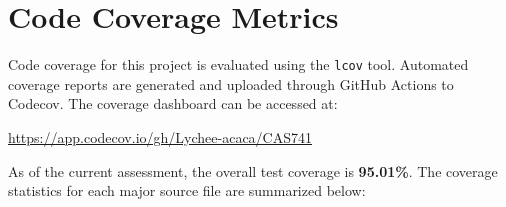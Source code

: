 \documentclass[12pt, titlepage]{article}
\begin{document}
\begin{table}[htbp!]
  \centering
  \caption{Traceability Matrix Showing the Connections Between Unit Tests and Modules}
  \label{Table:tc_trace}
\end{table}

\clearpage

\section{Code Coverage Metrics}

Code coverage for this project is evaluated using the \texttt{lcov} tool.
Automated coverage reports are generated and uploaded through GitHub Actions to
Codecov. The coverage dashboard can be accessed at:

\begin{center}
\url{https://app.codecov.io/gh/Lychee-acaca/CAS741}
\end{center}

As of the current assessment, the overall test coverage is \textbf{95.01\%}. The
coverage statistics for each major source file are summarized below:
\end{document}
